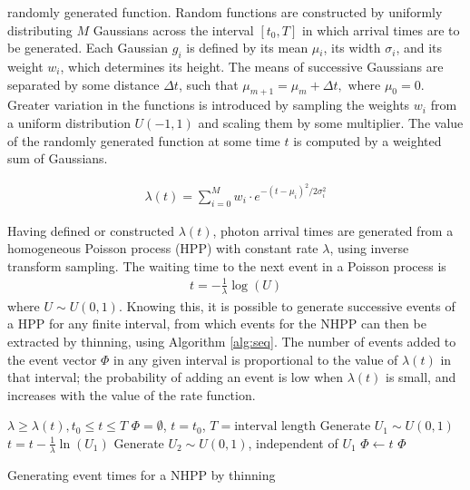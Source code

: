 \documentclass[a4paper,11pt]{article}
\begin{document}
  randomly generated function. Random functions are constructed by uniformly
  distributing $M$ Gaussians across the interval $\left[t_0,T\right]$ in which
  arrival times are to be generated. Each Gaussian $g_i$ is defined by its mean
  $\mu$$_i$, its width $\sigma$$_i$, and its weight $w_i$, which determines its
  height. The means of successive Gaussians are separated by some distance
  $\Delta t$, such that $\mu_{m+1}=\mu_m + \Delta t,\text{ where }
  \mu_0=0$. Greater variation in the functions is introduced by sampling the
  weights $w_i$ from a uniform distribution $U(-1,1)$ and scaling them by some
  multiplier. The value of the randomly generated function at some time $t$ is
  computed by a weighted sum of Gaussians.

  \begin{align}
  \lambda(t) = \sum_{i=0}^M w_i\cdot e^{-(t-\mu_i)^2/2\sigma_i^2}
  \end{align}

  Having defined or constructed $\lambda(t)$, photon arrival times are generated
  from a homogeneous Poisson process (HPP) with constant rate $\lambda$, using
  inverse transform sampling. The waiting time to the next event in a Poisson
  process is \cite{1998art}
  \begin{align}\label{eq:homlambda}
  t=-\frac{1}{\lambda}\log(U)
  \end{align} where $U\sim U(0,1)$. Knowing this, it is possible to generate
  successive events of a HPP for any finite interval, from which events for the
  NHPP can then be extracted by thinning, using Algorithm \ref{alg:seq}. The
  number of events added to the event vector $\Phi$ in any given interval is
  proportional to the value of $\lambda(t)$ in that interval; the probability of
  adding an event is low when $\lambda(t)$ is small, and increases with the
  value of the rate function.

  \begin{algorithm}[H]
  \begin{algorithmic}[1]
  \REQUIRE $\lambda\geq \lambda(t), t_0 \leq t \leq T$
  \STATE $\Phi=\emptyset$, $t=t_0$, $T=\text{interval length}$
  \STATE Generate $U_1\sim U(0,1)$
  \STATE $t=t-\frac{1}{\lambda}\ln(U_1)$
  \STATE Generate $U_2\sim U(0,1)$, independent of $U_1$
  \STATE $\Phi \leftarrow t$
  \ENDIF
  \ENDWHILE
  \RETURN $\Phi$
  \end{algorithmic}
  \caption{Generating event times for a NHPP by thinning}
  \label{alg:seq}
  \end{algorithm}
\end{document}
